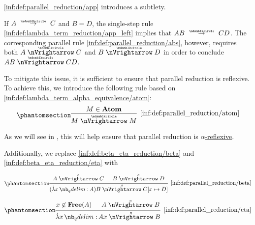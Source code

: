 \begin{definition}
\begin{thmenum}
     \ref{inf:def:parallel_reduction/app} introduces a subtlety.

    If \( A \pred C \) and \( B = D \), the single-step rule \ref{inf:def:lambda_term_reduction/app_left} implies that \( AB \pred CD \). The corresponding parallel rule \ref{inf:def:parallel_reduction/abs}, however, requires both \( A \ppred C \) and \( B \ppred D \) in order to conclude \( AB \ppred CD \).

    To mitigate this issue, it is sufficient to ensure that parallel reduction is reflexive. To achieve this, we introduce the following rule based on \ref{inf:def:lambda_term_alpha_equivalence/atom}:
    \begin{equation*}\taglabel[\ensuremath{ \logic{ParAtom}_{\Anon} }]{inf:def:parallel_reduction/atom}
      \begin{prooftree}
        \hypo{ M \in \op*{Atom} }
        \infer1[\ref{inf:def:parallel_reduction/atom}]{ M \ppred M }
      \end{prooftree}
    \end{equation*}

    As we will see in , this will help ensure that parallel reduction is \hyperref[def:alpha_reflexive]{\( \alpha \)-reflexive}.
  \end{thmenum}

   Additionally, we replace \ref{inf:def:beta_eta_reduction/beta} and \ref{inf:def:beta_eta_reduction/eta} with
  \begin{paracol}{2}
    \begin{leftcolumn}
      \ParacolAlignmentHack
      \begin{equation*}\taglabel[\ensuremath{ \logic{ParRed}_\beta }]{inf:def:parallel_reduction/beta}
        \begin{prooftree}
          \hypo{ A \pbred C }
          \hypo{ B \pbred D }
          \infer2[\ref{inf:def:parallel_reduction/beta}]{ (\qabs x A) B \pbred C[x \mapsto D] }.
        \end{prooftree}
      \end{equation*}
    \end{leftcolumn}

    \begin{rightcolumn}
      \ParacolAlignmentHack
      \begin{equation*}\taglabel[\ensuremath{ \logic{ParRed}_\eta }]{inf:def:parallel_reduction/eta}
        \begin{prooftree}
          \hypo{ x \not\in \op*{Free}(A) }
          \hypo{ A \pered B }
          \infer2[\ref{inf:def:parallel_reduction/eta}]{ \qabs x A x \pered B }.
        \end{prooftree}
      \end{equation*}
    \end{rightcolumn}
  \end{paracol}


\end{definition}
